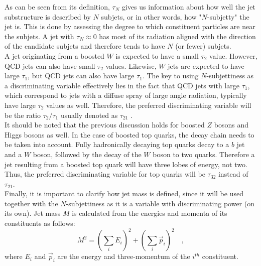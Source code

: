 \documentclass[main]{subfiles} %
\begin{document}
As can be seen from its definition, $\tau_N$ gives us information about how well the jet substructure is described by $N$ subjets, or in other words, how "$N$-subjetty" the jet is. This is done by assessing the degree to which constituent particles are near the subjets. A jet with $\tau_N \approx 0$ has most of its radiation aligned with the direction of the candidate subjets and therefore tends to have $N$ (or fewer) subjets.\\

A jet originating from a boosted $W$ is expected to have a small $\tau_2$ value. However, QCD jets can also have small $\tau_2$ values. Likewise, $W$ jets are expected to have large $\tau_1$, but QCD jets can also have large $\tau_1$. The key to using $N$-subjettiness as a discriminating variable effectively lies in the fact that QCD jets with large $\tau_1$, which correspond to jets with a diffuse spray of large angle radiation, typically have large $\tau_2$ values as well. Therefore, the preferred discriminating variable will be the ratio $\tau_2 / \tau_1$ usually denoted as $\tau_{21}$ \cite{Thaler2012}.\\

It should be noted that the previous discussion holds for boosted $Z$ bosons and Higgs bosons as well. In the case of boosted top quarks, the decay chain needs to be taken into account. Fully hadronically decaying top quarks decay to a $b$ jet and a $W$ boson, followed by the decay of the $W$ boson to two quarks. Therefore a jet resulting from a boosted top quark will have three lobes of energy, not two. Thus, the preferred discriminating variable for top quarks will be $\tau_{32}$ instead of $\tau_{21}$.\\

Finally, it is important to clarify how jet mass is defined, since it will be used together with the $N$-subjettiness as it is a variable with discriminating power (on its own). Jet mass $M$ is calculated from the energies and momenta of its constituents as follows:
\begin{equation}
  M^2 =  \left(\sum_i E_i\right)^2 + \left(\sum_i \vec{p}_i\right)^2 \quad ,
\end{equation}
where $E_i$ and $\vec{p}_i$ are the energy and three-momentum of the $i^{th}$ constituent.\\

\label{sect:LHC_ATLAS}
\vspace{20pt}
\end{document}
